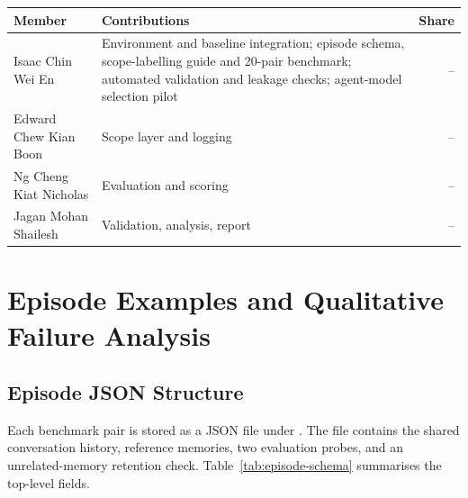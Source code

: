 \documentclass[11pt,a4paper]{article}
\begin{document}
\begin{table}[htbp]
\centering
\small
\begin{tabularx}{\linewidth}{lXr}
\toprule
Member & Contributions & Share \\
\midrule
Isaac Chin Wei En & Environment and baseline integration; episode schema, scope-labelling guide and 20-pair benchmark; automated validation and leakage checks; agent-model selection pilot & -- \\
Edward Chew Kian Boon & Scope layer and logging & -- \\
Ng Cheng Kiat Nicholas & Evaluation and scoring & -- \\
Jagan Mohan Shailesh & Validation, analysis, report & -- \\
\bottomrule
\end{tabularx}
\end{table}




\appendix


\section{Episode Examples and Qualitative Failure Analysis}
\label{app:failure-cases}

\subsection{Episode JSON Structure}
\label{app:episode-schema}

Each benchmark pair is stored as a JSON file under
. The file contains the shared
conversation history, reference memories, two evaluation
probes, and an unrelated-memory retention check.
Table~\ref{tab:episode-schema} summarises the top-level
fields.
\end{document}
